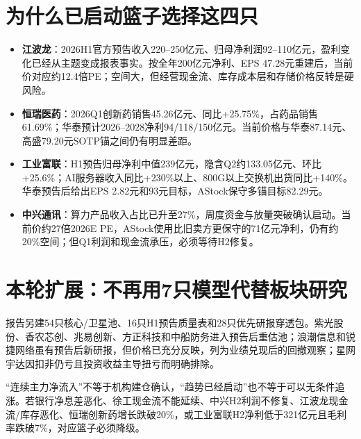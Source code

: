 \section{为什么已启动篮子选择这四只}

\begin{itemize}
  \item \textbf{江波龙}：2026H1官方预告收入220--250亿元、归母净利润92--110亿元，盈利变化已经从主题变成报表事实。按全年200亿元净利、EPS 47.28元重建后，当前价对应约12.4倍PE；空间大，但经营现金流、库存成本层和存储价格反转是硬风险。
  \item \textbf{恒瑞医药}：2026Q1创新药销售45.26亿元、同比+25.75\%，占药品销售61.69\%；华泰预计2026--2028净利94/118/150亿元。当前价格与华泰87.14元、高盛79.20元SOTP锚之间仍有明显差距。
  \item \textbf{工业富联}：H1预告归母净利中值239亿元，隐含Q2约133.05亿元、环比+25.6\%；AI服务器收入同比+230\%以上、800G以上交换机出货同比+140\%。华泰预告后给出EPS 2.82元和93元目标，AStock保守多锚目标82.29元。
  \item \textbf{中兴通讯}：算力产品收入占比已升至27\%，周度资金与放量突破确认启动。当前价约27倍2026E PE，AStock使用比旧卖方更保守的71亿元净利，仍有约20\%空间；但Q1利润和现金流承压，必须等待H2修复。
\end{itemize}

\section{本轮扩展：不再用7只模型代替板块研究}

报告另建54只核心/卫星池、16只H1预告质量表和28只优先研报穿透包。紫光股份、香农芯创、兆易创新、方正科技和中船防务进入预告后重估池；浪潮信息和锐捷网络虽有预告后新研报，但价格已充分反映，列为业绩兑现后的回撤观察；星网宇达因扣非仍亏且投资收益主导扭亏而明确排除。

\begin{riskbox}[最重要的反证]
“连续主力净流入”不等于机构建仓确认，“趋势已经启动”也不等于可以无条件追涨。若银行净息差恶化、徐工现金流不能延续、中兴H2利润不修复、江波龙现金流/库存恶化、恒瑞创新药增长跌破20\%，或工业富联H2净利低于321亿元且毛利率跌破7\%，对应篮子必须降级。
\end{riskbox}
